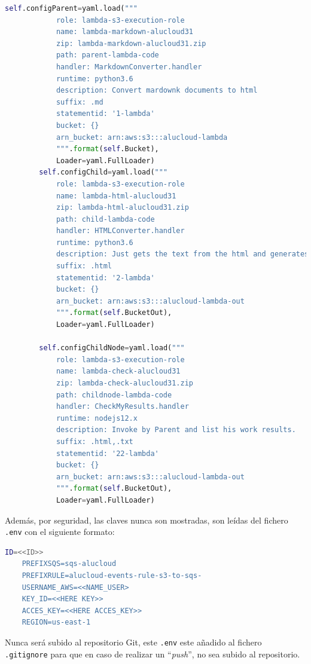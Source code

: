 \documentclass[
]{article}
\begin{document}
\begin{lstlisting}[language=Python, caption=Configuraciones de la clase SettingsAlucloud31]
self.configParent=yaml.load("""
            role: lambda-s3-execution-role
            name: lambda-markdown-alucloud31
            zip: lambda-markdown-alucloud31.zip
            path: parent-lambda-code
            handler: MarkdownConverter.handler
            runtime: python3.6
            description: Convert mardownk documents to html
            suffix: .md
            statementid: '1-lambda'
            bucket: {}
            arn_bucket: arn:aws:s3:::alucloud-lambda
            """.format(self.Bucket), 
            Loader=yaml.FullLoader)
        self.configChild=yaml.load("""
            role: lambda-s3-execution-role
            name: lambda-html-alucloud31
            zip: lambda-html-alucloud31.zip
            path: child-lambda-code
            handler: HTMLConverter.handler
            runtime: python3.6
            description: Just gets the text from the html and generates a txt file
            suffix: .html
            statementid: '2-lambda'
            bucket: {}
            arn_bucket: arn:aws:s3:::alucloud-lambda-out
            """.format(self.BucketOut), 
            Loader=yaml.FullLoader)

        self.configChildNode=yaml.load("""
            role: lambda-s3-execution-role
            name: lambda-check-alucloud31
            zip: lambda-check-alucloud31.zip
            path: childnode-lambda-code
            handler: CheckMyResults.handler
            runtime: nodejs12.x
            description: Invoke by Parent and list his work results.
            suffix: .html,.txt
            statementid: '22-lambda'
            bucket: {}
            arn_bucket: arn:aws:s3:::alucloud-lambda-out
            """.format(self.BucketOut), 
            Loader=yaml.FullLoader)
\end{lstlisting}

Además, por seguridad, las claves nunca son mostradas, son leídas del
fichero \texttt{.env} con el siguiente formato:

\begin{lstlisting}[language=bash,caption={Contenido de .env}]
	ID=<<ID>>
	PREFIXSQS=sqs-alucloud
	PREFIXRULE=alucloud-events-rule-s3-to-sqs-
	USERNAME_AWS=<<NAME_USER>
	KEY_ID=<<HERE KEY>>
	ACCES_KEY=<<HERE ACCES_KEY>>
	REGION=us-east-1
\end{lstlisting}

Nunca será subido al repositorio Git, este \texttt{.env} este añadido al
fichero \texttt{.gitignore} para que en caso de realizar un
``\emph{push}'', no sea subido al repositorio.
\end{document}
